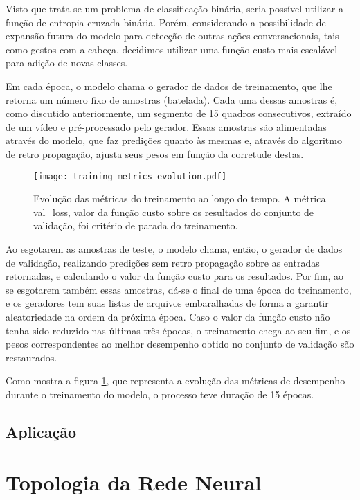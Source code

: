 Visto que trata-se um problema de classificação binária, seria possível utilizar a função de entropia cruzada binária. Porém, considerando a possibilidade de expansão futura do modelo para detecção de outras ações conversacionais, tais como gestos com a cabeça, decidimos utilizar uma função custo mais escalável para adição de novas classes.

Em cada época, o modelo chama o gerador de dados de treinamento, que lhe retorna um número fixo de amostras (batelada). Cada uma dessas amostras é, como discutido anteriormente, um segmento de 15 quadros consecutivos, extraído de um vídeo e pré-processado pelo gerador. Essas amostras são alimentadas através do modelo, que faz predições quanto às mesmas e, através do algoritmo de retro propagação, ajusta seus pesos em função da corretude destas.

\begin{figure}[ht]
    \centering
    \texttt{[image: training\_metrics\_evolution.pdf]}
    \caption{Evolução das métricas do treinamento ao longo do tempo. A métrica val\_loss, valor da função custo sobre os resultados do conjunto de validação, foi critério de parada do treinamento.}
    \label{fig:train_metrics_evo}
\end{figure}

Ao esgotarem as amostras de teste, o modelo chama, então, o gerador de dados de validação, realizando predições sem retro propagação sobre as entradas retornadas, e calculando o valor da função custo para os resultados. Por fim, ao se esgotarem também essas amostras, dá-se o final de uma época do treinamento, e os geradores tem suas listas de arquivos embaralhadas de forma a garantir aleatoriedade na ordem da próxima época. Caso o valor da função custo não tenha sido reduzido nas últimas três épocas, o treinamento chega ao seu fim, e os pesos correspondentes ao melhor desempenho obtido no conjunto de validação são restaurados.

Como mostra a figura \ref{fig:train_metrics_evo}, que representa a evolução das métricas de desempenho durante o treinamento do modelo, o processo teve duração de 15 épocas.

\subsection{Aplicação}
\label{subsec:application}

% 


\section{Topologia da Rede Neural}
\label{sec:topology}


